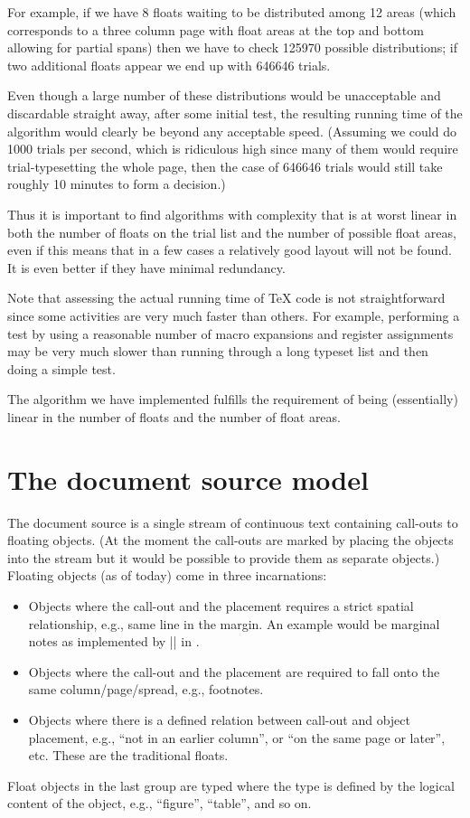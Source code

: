 \documentclass[twocolumn]{article}
\begin{document}
For example, if we have 8 floats waiting to be distributed among 12
areas (which corresponds to a three column page with float areas at the
top and bottom allowing for partial spans) then we have to check
125970 possible distributions; if two additional floats appear we end
up with 646646 trials.

Even though a large number of these distributions would be
unacceptable and discardable straight away, after some initial test,
the resulting running time of the algorithm would clearly be beyond
any acceptable speed. (Assuming we could do 1000 trials per second,
which is ridiculous high since many of them would require
trial-typesetting the whole page, then the case of 646646 trials would
still take roughly 10 minutes to form a decision.)

 Thus it is important to find algorithms with
complexity that is at worst linear in both the number of floats on the
trial list and the number of possible float areas, even if this means
that in a few cases a relatively good layout will not be found.
It is even better if they have minimal redundancy.


Note that assessing the actual running time of \TeX{} code is not
straightforward since some activities are very much faster than
others.  For example, performing a test by using a reasonable number
of macro expansions and register assignments may be very much slower
than running through a long typeset list and then doing a simple test.
 

The algorithm we have implemented fulfills the requirement of being
(essentially) linear in the number of floats and the number of float
areas.


\section{The document source model}

The document source is a single stream of continuous text containing
call-outs to floating objects. (At the moment the call-outs are marked
by placing the objects into the stream but it would be possible to
provide them as separate objects.) 
Floating objects (as of today) come in three incarnations:
\begin{itemize}
\item Objects where the call-out and the placement requires a strict
spatial relationship, e.g., same line in the margin. An example would
be marginal notes as implemented by |\marginpar| in \LaTeXe.
\item Objects where the call-out and the placement are required to fall
onto the same column/\allowbreak page/\allowbreak spread, e.g.,
footnotes.
\item Objects where there is a defined relation between call-out and
object placement, e.g., ``not in an earlier column'', or ``on the same
page or later'', etc. These are the traditional floats.
\end{itemize}
Float objects in the last group are typed where the type is defined by
the logical content of the object, e.g., ``figure'', ``table'', and so on.
\end{document}
